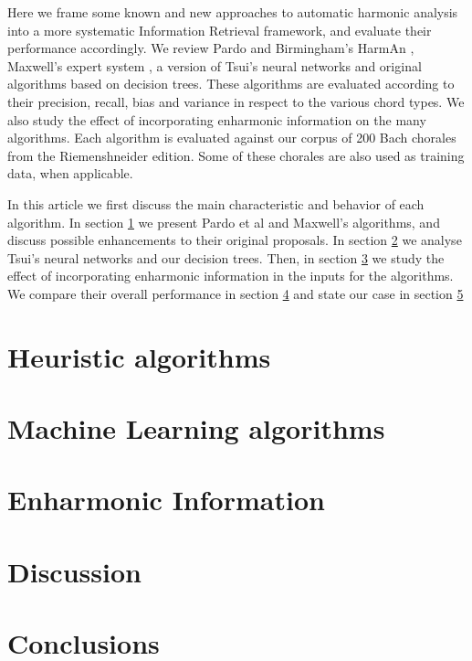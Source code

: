 \documentclass{article}
\begin{document}
Here we frame some known and new approaches to automatic harmonic
analysis into a more systematic Information Retrieval framework, and
evaluate their performance accordingly.  We review Pardo and
Birmingham's HarmAn \cite{pardo.ea:automated}, Maxwell's expert system
\cite{maxwell:expert}, a version of Tsui's neural networks
\cite{tsui:harmonic} and original algorithms based on decision trees.
These algorithms are evaluated according to their precision, recall,
bias and variance in respect to the various chord types.  We also
study the effect of incorporating enharmonic information on the many
algorithms. Each algorithm is evaluated against our corpus of 200 Bach
chorales from the Riemenshneider \cite{bach:371} edition.  Some of
these chorales are also used as training data, when applicable.

In this article we first discuss the main characteristic and behavior
of each algorithm. In section \ref{sec:heuristic-algorithms} we
present Pardo et al and Maxwell's algorithms, and discuss possible
enhancements to their original proposals. In section
\ref{sec:stat-algor} we analyse Tsui's neural networks and our
decision trees. Then, in section \ref{sec:enharmonic} we study the
effect of incorporating enharmonic information in the inputs for the
algorithms. We compare their overall performance in section
\ref{sec:discussion} and state our case in section \ref{sec:conclusions}


\section{Heuristic algorithms}
\label{sec:heuristic-algorithms}

\section{Machine Learning algorithms}
\label{sec:stat-algor}

\section{Enharmonic Information}
\label{sec:enharmonic}

\section{Discussion}
\label{sec:discussion}

\section{Conclusions}
\label{sec:conclusions}




\end{document}
